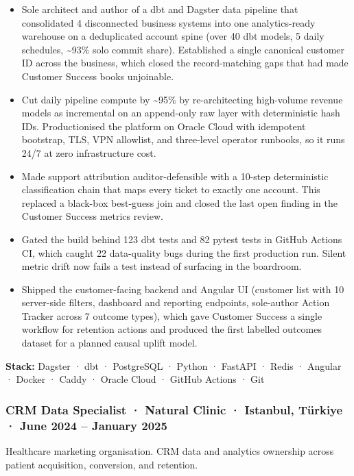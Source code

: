 \documentclass[
  10pt,
]{article}
\providecommand{\tightlist}{%
  \setlength{\itemsep}{0pt}\setlength{\parskip}{0pt}}
\begin{document}
\begin{itemize}
\tightlist
\item
  Sole architect and author of a dbt and Dagster data pipeline that
  consolidated 4 disconnected business systems into one analytics-ready
  warehouse on a deduplicated account spine (over 40 dbt models, 5 daily
  schedules, \textasciitilde93\% solo commit share). Established a
  single canonical customer ID across the business, which closed the
  record-matching gaps that had made Customer Success books unjoinable.
\item
  Cut daily pipeline compute by \textasciitilde95\% by re-architecting
  high-volume revenue models as incremental on an append-only raw layer
  with deterministic hash IDs. Productionised the platform on Oracle
  Cloud with idempotent bootstrap, TLS, VPN allowlist, and three-level
  operator runbooks, so it runs 24/7 at zero infrastructure cost.
\item
  Made support attribution auditor-defensible with a 10-step
  deterministic classification chain that maps every ticket to exactly
  one account. This replaced a black-box best-guess join and closed the
  last open finding in the Customer Success metrics review.
\item
  Gated the build behind 123 dbt tests and 82 pytest tests in GitHub
  Actions CI, which caught 22 data-quality bugs during the first
  production run. Silent metric drift now fails a test instead of
  surfacing in the boardroom.
\item
  Shipped the customer-facing backend and Angular UI (customer list with
  10 server-side filters, dashboard and reporting endpoints, sole-author
  Action Tracker across 7 outcome types), which gave Customer Success a
  single workflow for retention actions and produced the first labelled
  outcomes dataset for a planned causal uplift model.
\end{itemize}

\textbf{Stack:} Dagster · dbt · PostgreSQL · Python · FastAPI · Redis ·
Angular · Docker · Caddy · Oracle Cloud · GitHub Actions · Git

\subsubsection{CRM Data Specialist · Natural Clinic · Istanbul, Türkiye
· June 2024 -- January
2025}\label{crm-data-specialist-natural-clinic-istanbul-tuxfcrkiye-june-2024-january-2025}

Healthcare marketing organisation. CRM data and analytics ownership
across patient acquisition, conversion, and retention.
\end{document}

